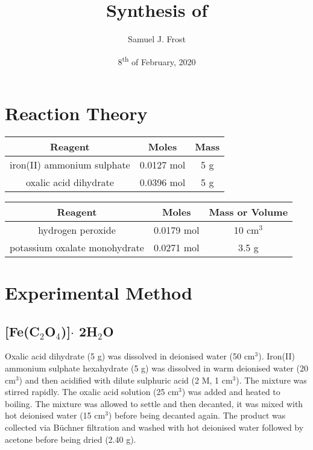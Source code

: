 \documentclass{article}
\title{Synthesis of \ce{K_3[Fe(C_2O_4)_3]*H_2O}}
\author{Samuel J. Frost}
\date{8\textsuperscript{th} of February, 2020}
\begin{document}
\maketitle

\section{Reaction Theory}

\centerline{\large{}}
\begin{center}
    \begin{tabular}{c|c|c}
        Reagent & Moles & Mass\\
        \hline
        iron(II) ammonium sulphate & 0.0127 mol & 5 g\\
        oxalic acid dihydrate & 0.0396 mol & 5 g\\
    \end{tabular}
\end{center}

\centerline{\large{}}
\begin{center}
    \begin{tabular}{c|c|c}
        Reagent & Moles & Mass or Volume\\
        \hline
        hydrogen peroxide & 0.0179 mol & 10 cm$^3$\\
        potassium oxalate monohydrate & 0.0271 mol & 3.5 g \\
    \end{tabular}
\end{center}

\newpage
\section{Experimental Method}
\subsection{[Fe(C$_2$O$_4$)]$\cdot$ 2H$_2$O}

Oxalic acid dihydrate (5 g) was dissolved in deionised water (50 cm$^3$). Iron(II) ammonium
sulphate hexahydrate (5 g) was dissolved in warm deionised water (20 cm$^3$) and then acidified
with dilute sulphuric acid (2 M, 1 cm$^3$). The mixture was stirred rapidly. The oxalic acid 
solution (25 cm$^3$) was added and heated to boiling. The mixture was allowed to settle and then
decanted, it was mixed with hot deionised water (15 cm$^3$) before being decanted again. The
product was collected via Büchner filtration and washed with hot deionised water followed by
acetone before being dried (2.40 g).
\end{document}
